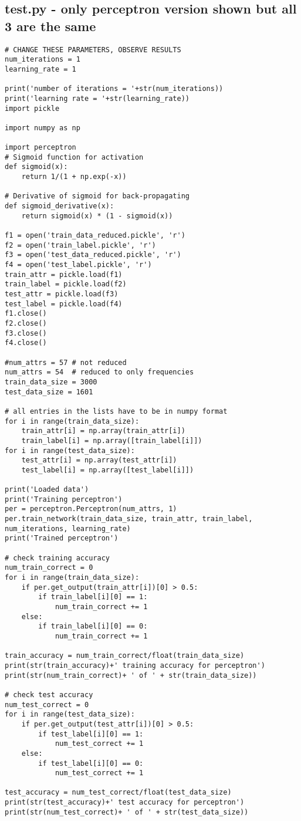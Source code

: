 \documentclass[11pt]{article} %
\begin{document}
\subsection{test.py - only perceptron version shown but all 3 are the same}
\begin{lstlisting}
# CHANGE THESE PARAMETERS, OBSERVE RESULTS
num_iterations = 1
learning_rate = 1

print('number of iterations = '+str(num_iterations))
print('learning rate = '+str(learning_rate))
import pickle

import numpy as np

import perceptron
# Sigmoid function for activation
def sigmoid(x):
    return 1/(1 + np.exp(-x))
    
# Derivative of sigmoid for back-propagating
def sigmoid_derivative(x):
    return sigmoid(x) * (1 - sigmoid(x))
    
f1 = open('train_data_reduced.pickle', 'r')
f2 = open('train_label.pickle', 'r')
f3 = open('test_data_reduced.pickle', 'r')
f4 = open('test_label.pickle', 'r')
train_attr = pickle.load(f1)
train_label = pickle.load(f2)
test_attr = pickle.load(f3)
test_label = pickle.load(f4)
f1.close()
f2.close()
f3.close()
f4.close()

#num_attrs = 57 # not reduced
num_attrs = 54  # reduced to only frequencies
train_data_size = 3000
test_data_size = 1601

# all entries in the lists have to be in numpy format
for i in range(train_data_size):
    train_attr[i] = np.array(train_attr[i])
    train_label[i] = np.array([train_label[i]])
for i in range(test_data_size):
    test_attr[i] = np.array(test_attr[i])
    test_label[i] = np.array([test_label[i]])

print('Loaded data')
print('Training perceptron')
per = perceptron.Perceptron(num_attrs, 1)
per.train_network(train_data_size, train_attr, train_label, num_iterations, learning_rate)
print('Trained perceptron')

# check training accuracy
num_train_correct = 0
for i in range(train_data_size):
    if per.get_output(train_attr[i])[0] > 0.5:
        if train_label[i][0] == 1:
            num_train_correct += 1
    else:
        if train_label[i][0] == 0:
            num_train_correct += 1

train_accuracy = num_train_correct/float(train_data_size)
print(str(train_accuracy)+' training accuracy for perceptron')
print(str(num_train_correct)+ ' of ' + str(train_data_size))

# check test accuracy
num_test_correct = 0
for i in range(test_data_size):
    if per.get_output(test_attr[i])[0] > 0.5:
        if test_label[i][0] == 1:
            num_test_correct += 1
    else:
        if test_label[i][0] == 0:
            num_test_correct += 1

test_accuracy = num_test_correct/float(test_data_size)
print(str(test_accuracy)+' test accuracy for perceptron')
print(str(num_test_correct)+ ' of ' + str(test_data_size))
\end{lstlisting}
\end{document}
